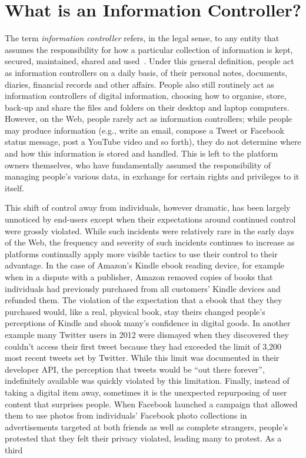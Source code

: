 \documentclass{amsart}
\begin{document}
\section{What is an Information Controller?}

The term \emph{information controller} refers, in the legal sense, to any entity that assumes the responsibility for how a particular collection of information is kept, secured, maintained, shared and used~\cite{}.  Under this general definition, people act as information controllers on a daily basis, of their personal notes, documents, diaries, financial records and other affairs.  People also still routinely act as information controllers of digital information, choosing how to organise, store, back-up and share the files and folders on their desktop and laptop computers. However, on the Web, people rarely act as information controllers; while people may produce information (e.g., write an email, compose a Tweet or Facebook status message, post a YouTube video and so forth), they do not determine where and how this information is stored and handled.  This is left to the platform owners themselves, who have fundamentally assumed the responsibility of managing people's various data, in exchange for certain rights and privileges to it itself.

This shift of control away from individuals, however dramatic, has been largely unnoticed by end-users except when their expectations around continued control were grossly violated.  While such incidents were relatively rare in the early days of the Web, the frequency and severity of such incidents continues to increase as platforms continually apply more visible tactics to use their control to their advantage.   In the case of Amazon's Kindle ebook reading device, for example when in a dispute with a publisher, Amazon removed copies of books that individuals had previously purchased from all customers' Kindle devices and refunded them.  The violation of the expectation that a ebook that they they purchased would, like a real, physical book, stay theirs changed people's perceptions of Kindle and shook many's confidence in digital goods.  In another example many Twitter users in 2012 were dismayed when they discovered they couldn't access their first tweet because they had exceeded the limit of 3,200 most recent tweets set by Twitter.  While this limit was documented in their developer API, the perception that tweets would be ``out there forever'', indefinitely available was quickly violated by this limitation.  Finally, instead of taking a digital item away, sometimes it is the unexpected repurposing of user content that surprises people.  When Facebook launched a campaign that allowed them to use photos from individuals' Facebook photo collections in advertisements targeted at both friends as well as complete strangers, people's protested that they felt their privacy violated, leading many to protest.  As a third
\end{document}
